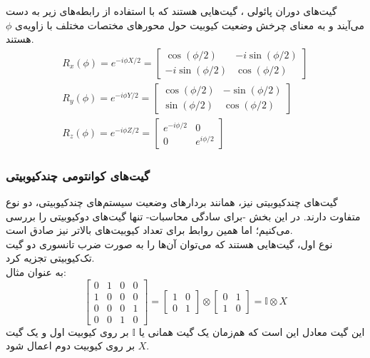گیت‌های دوران پائولی
، گیت‌هایی هستند که با استفاده از رابطه‌های زیر به دست می‌آیند و به معنای چرخش وضعیت کیوبیت حول محورهای مختصات مختلف با زاویه‌ی 
$\phi$
هستند.
\begin{equation}
\begin{gathered}
    R_x(\phi) = e^{-i \phi X/2} = 
            \begin{bmatrix}
                \cos(\phi/2) & -i\sin(\phi/2) \\
                -i\sin(\phi/2) & \cos(\phi/2)
            \end{bmatrix}
            \\[3pt]
    R_y(\phi) = e^{-i\phi Y/2} = 
            \begin{bmatrix}
                \cos(\phi/2) & -\sin(\phi/2) \\
                \sin(\phi/2) & \cos(\phi/2)
            \end{bmatrix}
            \\[3pt]
    R_z(\phi) = e^{-i\phi Z/2} = \begin{bmatrix}
                e^{-i\phi/2} & 0 \\
                0 & e^{i\phi/2}
            \end{bmatrix}
\end{gathered}
\end{equation}

\subsubsection{
    گیت‌های کوانتومی چند‌کیوبیتی
}
گیت‌های چندکیوبیتی نیز، همانند بردارهای وضعیت سیستم‌های چندکیوبیتی، دو نوع متفاوت دارند. در این بخش -برای سادگی محاسبات- تنها گیت‌های دوکیوبیتی را بررسی می‌کنیم؛ اما همین روابط برای تعداد کیوبیت‌های بالاتر نیز صادق است. \\
نوع اول، گیت‌هایی هستند که می‌توان آن‌ها را به صورت ضرب تانسوری دو گیت تک‌کیوبیتی تجزیه کرد.
\\
به عنوان مثال:
\begin{equation}
    \begin{bmatrix}
    0 & 1 & 0 & 0 \\[3pt]
    1 & 0 & 0 & 0 \\[3pt]
    0 & 0 & 0 & 1 \\[3pt]
    0 & 0 & 1 & 0 
    \end{bmatrix} =
    \begin{bmatrix}
    1 & 0 \\[3pt]
    0 & 1 
    \end{bmatrix} \otimes
    \begin{bmatrix}
    0 & 1 \\[3pt]
    1 & 0
    \end{bmatrix}
    = \mathbb{I} \otimes X
\end{equation}
این گیت معادل این است که هم‌زمان یک گیت همانی یا
$\mathbb{I}$
بر روی کیوبیت اول و یک گیت
$X$
بر روی کیوبیت دوم اعمال شود.

